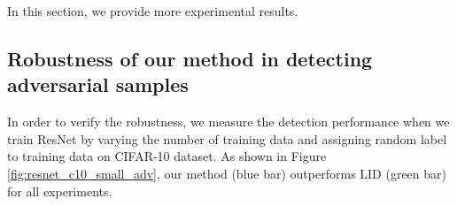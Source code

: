 \documentclass{article}
\begin{document}
In this section, we provide more experimental results.


\subsection{Robustness of our method in detecting adversarial samples} \label{appendix:robust_lid}

In order to verify the robustness, we measure the detection performance when we train ResNet by varying the number of training data and assigning random label to training data on CIFAR-10 dataset. As shown in Figure \ref{fig:resnet_c10_small_adv}, our method (blue bar) outperforms LID (green bar) for all experiments.

\begin{figure*} [t] \centering
{} 
\vspace{-0.1in}
\,
\vspace{-0.1in}
\caption{Comparison of AUROC (\%) under different training data. To evaluate the robustness of proposed method, we train ResNet (a) by varying the number of training data and (b) assigning random label to training data on CIFAR-10 dataset.}
\label{fig:resnet_c10_small_adv}
\end{figure*}



\begin{figure*} [t] \centering\setlength{\tabcolsep}{0cm}
\caption{Experimental results of class-incremental learning on CIFAR-100 and CIFAR-10 datasets.
We report (left) AUC with respect to the number of learned classes and, 
(right) the base-new class accuracy curve after the last new classes is added.}
\label{fig:increme}
\end{figure*}
\end{document}
